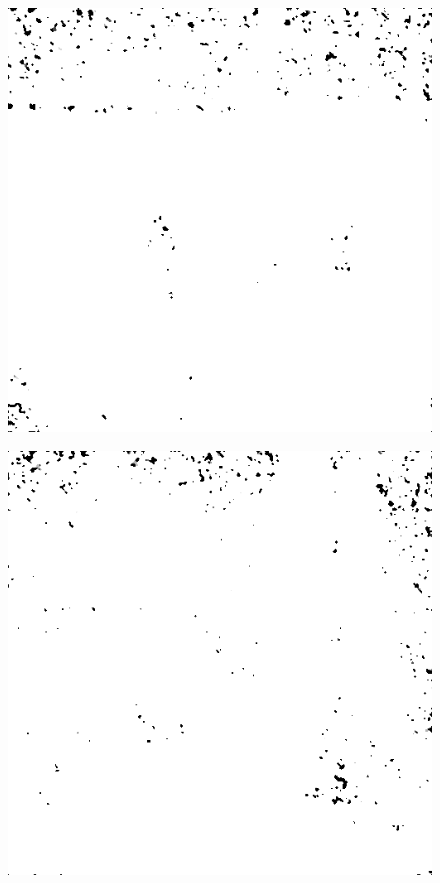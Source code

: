 \begin{figure}[H]
\begin{minipage}[t]{0.3\linewidth}
	\label{fig:car_m20}
\end{minipage}
\begin{minipage}[t]{0.3\linewidth} %
	\includegraphics[width = 1\linewidth]{gfx/hus/hus_m20.png}
	\subcaption{}
	\label{fig:hus_m20}
\end{minipage}
\begin{minipage}[t]{0.3\linewidth} %
	\includegraphics[width = 1\linewidth]{gfx/sit/sit_m20.png}

\end{minipage}
\end{figure}
